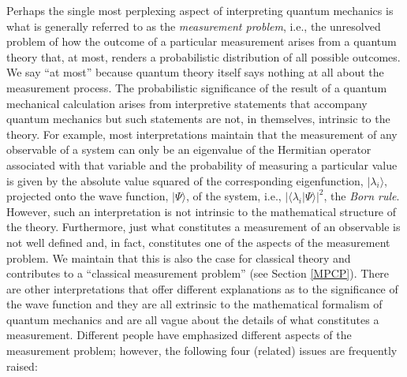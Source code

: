 \documentclass [12pt]{revtex4}
\begin{document}
Perhaps the single most perplexing aspect of interpreting quantum
mechanics is what is generally referred to as the
\textit{measurement problem}, i.e., the unresolved problem of how
the outcome of a particular measurement arises from a quantum theory
that, at most, renders a probabilistic distribution of all possible
outcomes. We say ``at most'' because quantum theory itself says
nothing at all about the measurement process. The probabilistic
significance of the result of a quantum mechanical calculation
arises from interpretive statements that accompany quantum mechanics
but such statements are not, in themselves, intrinsic to the theory.
For example, most interpretations maintain that the
measurement of any observable of a system can only be an eigenvalue
of the Hermitian operator associated with that variable and the
probability of measuring a particular value is given by the absolute
value squared of the corresponding eigenfunction,
$|\lambda_i\rangle$, projected onto the wave function,
$|\Psi\rangle$, of the system, i.e.,
$|\langle\lambda_i|\Psi\rangle|^2$, the {\it Born rule}. However,
such an interpretation is not intrinsic to the mathematical
structure of the theory.  Furthermore, just what constitutes a
measurement of an observable is not well defined and, in fact,
constitutes one of the aspects of the measurement problem. We
maintain that this is also the case for classical theory and contributes
to a ``classical measurement problem'' (see Section \ref{MPCP}).  There
are other interpretations that offer different explanations as to
the significance of the wave function and they are all extrinsic to
the mathematical formalism of quantum mechanics and are all vague
about the details of what constitutes a measurement. Different
people have emphasized different aspects of the measurement problem;
however, the following four (related) issues are frequently raised:
\end{document}
